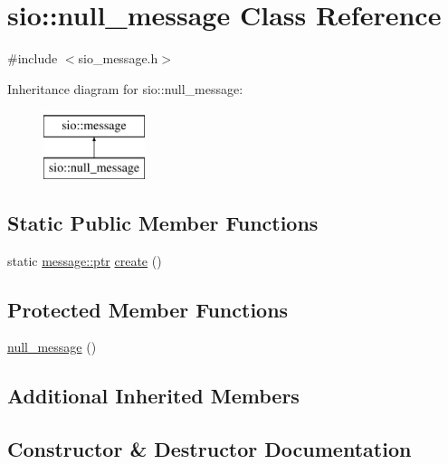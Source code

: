 \hypertarget{classsio_1_1null__message}{}\section{sio\+:\+:null\+\_\+message Class Reference}
\label{classsio_1_1null__message}


{\ttfamily \#include $<$sio\+\_\+message.\+h$>$}

Inheritance diagram for sio\+:\+:null\+\_\+message\+:\begin{figure}[H]
\begin{center}
\leavevmode
\includegraphics[height=2.000000cm]{classsio_1_1null__message}
\end{center}
\end{figure}
\subsection*{Static Public Member Functions}
\begin{DoxyCompactItemize}
\item 
static \hyperlink{classsio_1_1message_a6340b6fef57e4516eb17928b1885a615}{message\+::ptr} \hyperlink{classsio_1_1null__message_a829d67c9ff528a8eef8597c58e868802}{create} ()
\end{DoxyCompactItemize}
\subsection*{Protected Member Functions}
\begin{DoxyCompactItemize}
\item 
\hyperlink{classsio_1_1null__message_a1518dd808081df4b79a753ead398f902}{null\+\_\+message} ()
\end{DoxyCompactItemize}
\subsection*{Additional Inherited Members}


\subsection{Constructor \& Destructor Documentation}
\mbox{\label{classsio_1_1null__message_a1518dd808081df4b79a753ead398f902}} 
